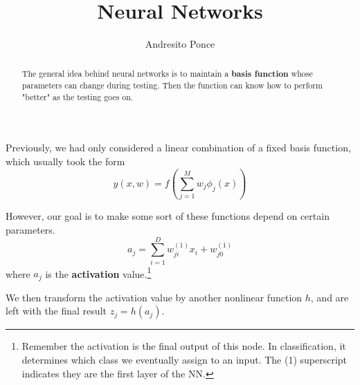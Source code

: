 \documentclass{tufte-handout}
\title{Neural Networks}
\author{Andresito Ponce}
\begin{document}
\maketitle

\begin{abstract}
	The general idea behind neural networks is to 
	maintain a \textbf{basis function} whose parameters
	can change during testing. Then the function can know 
	how to perform "better" as the testing goes on.
\end{abstract}

Previously, we had only considered a linear combination of a fixed
basis function, which usually took the form
\[ y(x, w) = f(\sum_{j=1}^{M}w_{j}\phi_{j}(x))\]

However, our goal is to make some sort of these functions depend on
certain parameters.
\[ a_{j} = \sum_{i=1}^{D}w^{(1)}_{ji}x_{i} + w^{(1)}_{j0}\]
where $a_{j}$ is the \textbf{activation} value.\footnote{Remember the
activation is the final output of this node. In classification, it 
determines which class we eventually assign to an input. The (1) 
superscript indicates they are the first layer of the NN.}

We then transform the activation value by another nonlinear function
$h$, and are left with the final result $z_{j} = h(a_{j})$. 
\end{document}
